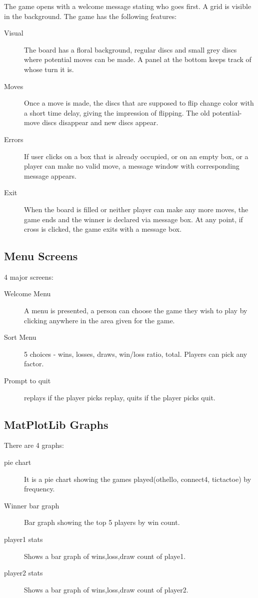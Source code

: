 \documentclass[12pt]{article}
\begin{document}
The game opens with a welcome message stating who goes first. A grid is visible in the background. The game has the following features:
\begin{description} 
\item[Visual] The board has a floral background, regular discs and small grey discs where potential moves can be made. A panel at the bottom keeps track of whose turn it is.
\item[Moves] Once a move is made, the discs that are supposed to flip change color with a short time delay, giving the impression of flipping. The old potential-move discs disappear and new discs appear. 
\item[Errors] If user clicks on a box that is already occupied, or on an empty box, or a player can make no valid move, a message window with corresponding message appears. 
\item [Exit] When the board is filled or neither player can make any more moves, the game ends and the winner is declared via message box. At any point, if cross is clicked, the game exits with a message box.

\end{description}

\subsection{Menu Screens}

4 major screens:

\begin{description} 
\item[Welcome Menu] A menu is presented, a person can choose the game they wish to play by clicking anywhere in the area given for the game.
\item[Sort Menu] 5 choices - wins, losses, draws, win/loss ratio, total. Players can pick any factor.
\item[Prompt to quit] replays if the player picks replay, quits if the player picks quit.


\end{description}

\subsection{MatPlotLib Graphs}

There are 4 graphs:

\begin{description} 
\item[pie chart] It is a pie chart showing the games played(othello, connect4, tictactoe) by frequency.
\item[Winner bar graph] Bar graph showing the top 5 players by win count. 
\item[player1 stats] Shows a bar graph of wins,loss,draw count of playe1.
\item[player2 stats] Shows a bar graph of wins,loss,draw count of player2.
\end{description}
\end{document}
